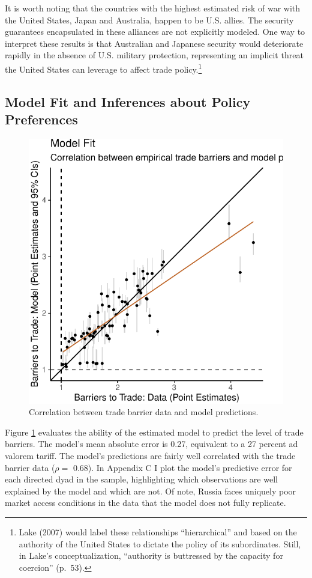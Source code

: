 \documentclass{puthesis}
\begin{document}
It is worth noting that the countries with the highest estimated risk of
war with the United States, Japan and Australia, happen to be U.S.
allies. The security guarantees encapsulated in these alliances are not
explicitly modeled. One way to interpret these results is that
Australian and Japanese security would deteriorate rapidly in the
absence of U.S. military protection, representing an implicit threat the
United States can leverage to affect trade policy.\footnote{Lake (2007)
  would label these relationships ``hierarchical'' and based on the
  authority of the United States to dictate the policy of its
  subordinates. Still, in Lake's conceptualization, ``authority is
  buttressed by the capacity for coercion'' (p.~53).}

\subsection{Model Fit and Inferences about Policy Preferences}

\begin{figure}
\centering
\includegraphics{figure/fit-1.pdf}
\caption{Correlation between trade barrier data and model predictions.
\label{fig:fit}}
\end{figure}

Figure \ref{fig:fit} evaluates the ability of the estimated model to
predict the level of trade barriers. The model's mean absolute error is
0.27, equivalent to a 27 percent ad valorem tariff. The model's
predictions are fairly well correlated with the trade barrier data
(\(\rho=\) 0.68). In Appendix C I plot the model's predictive error for
each directed dyad in the sample, highlighting which observations are
well explained by the model and which are not. Of note, Russia faces
uniquely poor market access conditions in the data that the model does
not fully replicate.
\end{document}
